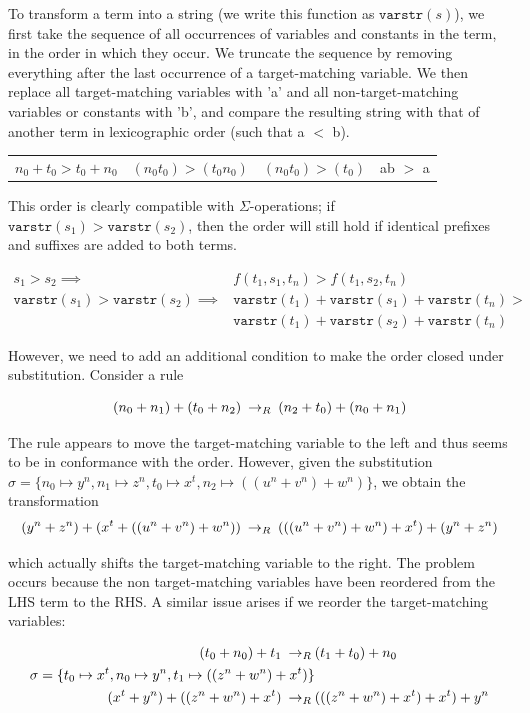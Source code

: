 To transform a term into a string (we write this function as $\texttt{varstr}(s)$), we first take the sequence of all occurrences of variables and constants in the term, in the order in which they occur. We truncate the sequence by removing everything after the last occurrence of a target-matching variable. We then replace all target-matching variables with 'a' and all non-target-matching variables or constants with 'b', and compare the resulting string with that of another term in lexicographic order (such that a $<$ b).

\begin{tabular}{l|l|l|l}
\centering
$n_0 + t_0 > t_0 + n_0$ & $(n_0 t_0) > (t_0 n_0)$ & $(n_0 t_0) > (t_0)$ & ab $>$ a \\
\end{tabular}

This order is clearly compatible with $\Sigma$-operations; if $\texttt{varstr}(s_1) > \texttt{varstr}(s_2)$, then the order will still hold if identical prefixes and suffixes are added to both terms. 

\begin{align*}
s_1 > s_2 \implies & f(t_1,s_1,t_n) > f(t_1,s_2,t_n) \\
\texttt{varstr}(s_1) > \texttt{varstr}(s_2) \implies & \texttt{varstr}(t_1) + \texttt{varstr}(s_1) + \texttt{varstr}(t_n) > \\
&\texttt{varstr}(t_1) + \texttt{varstr}(s_2) + \texttt{varstr}(t_n)
\end{align*}

However, we need to add an additional condition to make the order closed under substitution. Consider a rule

\[ (n_0 + n_1) + (t_0 + n_2) \:\rightarrow_{R}\: (n_2 + t_0) + (n_0 + n_1)
\]

The rule appears to move the target-matching variable to the left and thus seems to be in conformance with the order. However, given the substitution $\sigma = \{ n_0 \mapsto y^n, n_1 \mapsto z^n, t_0 \mapsto x^t, n_2 \mapsto ((u^n + v^n) + w^n)\}$, we obtain the transformation
\[ (y^n + z^n) + (x^t + ((u^n + v^n) + w^n)) \:\rightarrow_{R}\: (((u^n + v^n) + w^n) + x^t) + (y^n + z^n)
\]

which actually shifts the target-matching variable to the right. The problem occurs because the non target-matching variables have been reordered from the LHS term to the RHS. A similar issue arises if we reorder the target-matching variables:

\begin{align*}
(t_0 + n_0) + t_1 \:\rightarrow_{R}\: & (t_1 + t_0) + n_0 \\
\sigma = \{ t_0 \mapsto x^t, n_0 \mapsto y^n, t_1 \mapsto ((z^n + w^n) + x^t)\} \\
(x^t + y^n) + ((z^n + w^n) + x^t) \:\rightarrow_{R}\: & (((z^n + w^n) + x^t) + x^t) + y^n
\end{align*}

